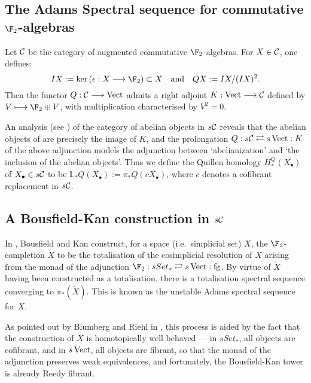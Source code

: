 \documentclass[10pt]{article}
\renewcommand{\Set}{Set}
\newcommand{\forget}{\mathrm{fg}}
\newcommand{\Comm}{\calC}
\begin{document}
\begin{AdamsDerivation}
\section{The Adams Spectral sequence for commutative $\F_2$-algebras}
Let $\Comm$ be the category of augmented commutative $\F_2$-algebras. For $X\in \Comm$, one defines:
\[IX:=\ker(\epsilon:X\to\F_2)\subset X\textup{\quad and\quad }QX:=IX/(IX)^2.\]
Then the functor $Q:\Comm\to\Vect$ admits a right adjoint $K:\Vect\to\Comm$ defined by $V\mapsto \F_2\oplus V$, with multiplication characterised by $V^2=0$.

An analysis (see \cite[\S4]{MR1089001}) of the category of abelian objects in $s\Comm$ reveals that the abelian objects of are precisely the image of $K$, and the prolongation $Q:s\Comm\rightleftarrows s\Vect:K$ of the above adjunction models the adjunction between `abelianization' and `the inclusion of the abelian objects'. Thus we define the Quillen homology $H_*^Q(X_{\bullet})$ of $X_{\bullet}\in s\Comm$ to be $\mathbb{L}_*Q(X_{\bullet}):=\pi_*Q(cX_\bullet)$, where $c$ denotes a cofibrant replacement in $s\Comm$.





\subsection{A Bousfield-Kan construction in $s\Comm$}
In \cite{MR0365573}, Bousfield and Kan construct, for a space (i.e.\ simplicial set) $X$, the $\F_2$-completion $\check X$ to be the totalisation of the cosimplicial resolution of $X$ arising from the monad of the adjunction $\F_2:s\Set_*\rightleftarrows s\Vect:\forget$. By virtue of $\check X$ having been constructed as a totalisation, there is a totalisation spectral sequence converging to $\pi_*(\check X)$. This is known as the unstable Adams spectral sequence for $X$.

As pointed out by Blumberg and Riehl in \cite{BlumRiehlResolutions.pdf}, this process is aided by the fact that the construction of $\check X$ is homotopically well behaved --- in $s\Set_*$, all objects are cofibrant, and in $s\operatorname{Vect}$, all objects are fibrant, so that the monad of the adjunction preserves weak equivalences, and fortunately, the Bousfield-Kan tower is already Reedy fibrant.


\end{AdamsDerivation}
\end{document}
